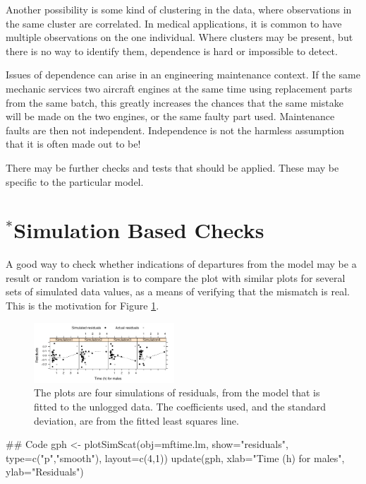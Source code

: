 \documentclass{tufte-book}\usepackage[]{graphicx}\usepackage[]{color}
\begin{document}
 Another possibility is some kind of clustering in the data, where
 observations in the same cluster are correlated. In medical
 applications, it is common to have multiple observations on the one
 individual.   Where clusters may be present, but there is no way to
 identify them, dependence is hard or impossible to detect.

 Issues of dependence can arise in an engineering maintenance context.
 If the same mechanic services two aircraft engines at the same time
 using replacement parts from the same batch, this greatly increases
 the chances that the same mistake will be made on the two engines, or
 the same faulty part used.  Maintenance faults are then not
 independent. Independence is not the harmless assumption that it is
 often made out to be!

There may be further checks and tests that should be applied.
These may be specific to the particular model.

\section{$^*$Simulation Based Checks}\label{sec:simcheck}

A good way to check whether indications of departures from the model
may be a result or random variation is to compare the plot with
similar plots for several sets of simulated data values, as a means of
verifying that the mismatch is real. This is the motivation for Figure
\ref{fig:4sim-mftimeres1}.

\begin{figure}
\vspace*{-12pt}

\begin{Schunk}


\centerline{\includegraphics[width=0.47\textwidth]{figs/11-simscat-1} }

\end{Schunk}
\caption{The plots are four simulations of residuals, from the
  model that is fitted to the unlogged data.  The coefficients
  used, and the standard deviation, are from the fitted least squares
  line.\label{fig:4sim-mftimeres1}}
%
\end{figure}
\begin{Schunk}
\begin{Sinput}
## Code
gph <- plotSimScat(obj=mftime.lm, show="residuals",
                   type=c("p","smooth"),
                   layout=c(4,1))
update(gph, xlab="Time (h) for males",
      ylab="Residuals")
\end{Sinput}
\end{Schunk}
\end{document}

